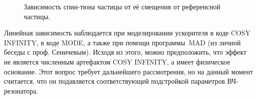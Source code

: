\begin{figure}[H]\centering
	\caption{Зависимость спин-тюна частицы от её смещения от референсной частицы.\label{fig:decoh:perfect}}
\end{figure}

Линейная зависимость наблюдается при моделировании ускорителя в коде COSY INFINITY, в коде MODE, 
а также при помощи программы MAD (из личной беседы с проф. Сеничевым). 
Исходя из этого, можно предположить, что эффект не является численным артефактом COSY INFINITY,
а имеет физическое основание. Этот вопрос требует дальнейшего рассмотрения, 
но на данный момент считается, что он подавляется соответствующей подстройкой 
параметров ВЧ-резонатора.~\cite[стр.~210,~219]{Eremey:Thesis}


